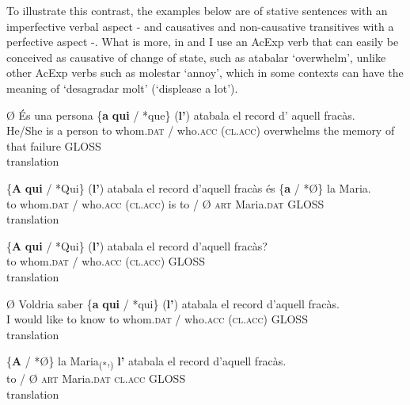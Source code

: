 \documentclass[output=paper,modfonts,nonflat,newtxmath]{langsci/langscibook}
\begin{document}
To illustrate this contrast, the examples below are of stative sentences with an imperfective verbal aspect -  and causatives and non-causative transitives with a perfective aspect -. What is more, in  and  I use an AcExp verb that can easily be conceived as causative of change of state, such as {atabalar} ‘overwhelm’, unlike other AcExp verbs such as {molestar} ‘annoy’, which in some contexts can have the meaning of ‘desagradar molt’ (‘displease a lot’).

\ea%
 \label{ex:royo:14}
 \ea \label{ex:royo:14a}
 \gll Ø És una persona \{\textbf{a} \textbf{qui} / *que\} (\textbf{l’}) atabala el record d’ aquell fracàs.\\
  He/She is a person to whom.\textsc{dat} / who.\textsc{acc} (\textsc{cl.acc}) overwhelms the memory of that failure GLOSS\\
 \glt translation
 
 \ex \label{ex:royo:14b}
 \gll \{\textbf{A} \textbf{qui} / *Qui\} (\textbf{l’}) atabala el record d’aquell fracàs és \{\textbf{a} / *Ø\} la Maria.\\
 to whom.\textsc{dat} / who.\textsc{acc} (\textsc{cl.acc}) is to / Ø \textsc{art} Maria.\textsc{dat} GLOSS\\
 \glt translation
 
 \ex \label{ex:royo:14c}
 \gll \{\textbf{A} \textbf{qui} / *Qui\} (\textbf{l’}) atabala el record d’aquell fracàs?\\
 to whom.\textsc{dat} / who.\textsc{acc} (\textsc{cl.acc}) GLOSS\\
 \glt translation
 
 \ex \label{ex:royo:14d}
 \gll Ø Voldria saber \{\textbf{a} \textbf{qui} / *qui\} (\textbf{l’}) atabala el record d’aquell fracàs.\\
 I would like to know to whom.\textsc{dat} / who.\textsc{acc} (\textsc{cl.acc}) GLOSS\\
 \glt translation
 
 \ex \label{ex:royo:14e}
 \gll \{\textbf{A} / *Ø\} la Maria\textsubscript{(*},\textsubscript{)} \textbf{l’} atabala el record d’aquell fracàs.\\
 to / Ø \textsc{art} Maria.\textsc{dat} \textsc{cl.acc} GLOSS\\
 \glt translation
 
 
 \z
 \z
 

 

\ea%
 \label{ex:royo:15}
 
\end{document}
